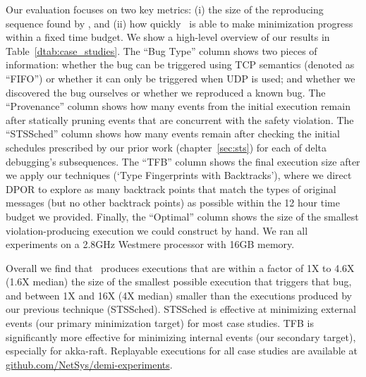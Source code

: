 
Our evaluation focuses on two key metrics: (i) the size of
the reproducing sequence found by \sys, and (ii) how quickly
\sys~is able to make minimization progress within a fixed time
budget. We show a high-level overview
of our results in Table~\ref{dtab:case_studies}.
The ``Bug Type'' column shows two pieces of information: whether the bug can be
triggered using TCP semantics (denoted as ``FIFO'')
or whether it can only be triggered when UDP is used; and whether we discovered
the bug ourselves or whether we
reproduced a known bug. The ``Provenance'' column shows how many events from the initial execution
remain after statically pruning events
that are concurrent with the safety violation.
The ``STSSched'' column shows how many events remain after checking the initial schedules
prescribed by our prior work (chapter~\ref{sec:sts}) for each of delta debugging's
subsequences. The ``TFB'' column shows the final execution size after
we apply our techniques (`Type Fingerprints with Backtracks'), where we direct
DPOR to explore as many backtrack points that match the types of original
messages (but no other
backtrack points) as possible within the 12 hour time budget we provided.
Finally, the ``Optimal'' column shows the size of the smallest
violation-producing execution we could construct by hand.
We ran all experiments on a 2.8GHz Westmere processor with 16GB memory.

Overall we find
that \sys~produces executions that are within
a factor of 1X to 4.6X (1.6X median) the size of the smallest possible execution
that triggers that bug, and between 1X and 16X (4X median) smaller than the
executions produced by our previous technique (STSSched).
STSSched is effective at minimizing external events (our primary minimization
target) for most case studies. TFB is
significantly more effective for minimizing internal events (our secondary
target), especially for akka-raft.
Replayable executions for all case studies are available at
\href{https://github.com/NetSys/demi-experiments}{github.com/NetSys/demi-experiments}.


